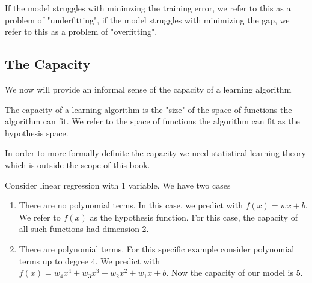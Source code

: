 If the model struggles with minimzing the training error, we refer to this as a problem of "underfitting", if the model struggles with minimizing the gap, we refer to this as a problem of "overfitting".

\subsection{The Capacity}

We now will provide an informal sense of the capacity of a learning algorithm

\begin{definition}
    The capacity of a learning algorithm is the "size" of the space of functions the algorithm can fit.
    We refer to the space of functions the algorithm can fit as the hypothesis space.
\end{definition}

\begin{remark}
    In order to more formally definite the capacity we need statistical learning theory which is outside the scope of this book.
\end{remark}

\begin{example}
    Consider linear regression with 1 variable. We have two cases
    \begin{enumerate}
        \item There are no polynomial terms. In this case, we predict with $f(x)=wx+b$. We refer to $f(x)$ as the hypothesis function. For this case, the capacity of all such functions had dimension 2.
        \item There are polynomial terms. For this specific example consider polynomial terms up to degree 4. We predict with $f(x)=w_4x^4+w_3x^3+w_2x^2+w_1x+b$. Now the capacity of our model is 5.
    \end{enumerate}
\end{example}

